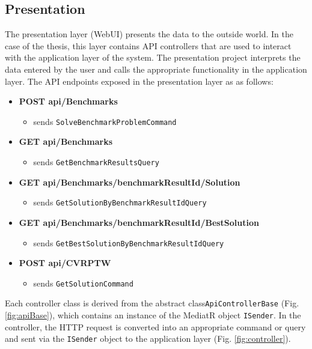 \documentclass[a4paper,twoside,12pt]{book}
\begin{document}
\subsection{Presentation}

The presentation layer (WebUI) presents the data to the outside world. In the case of the thesis, this layer contains API controllers that are used to interact with the application layer of the system. The presentation project interprets the data entered by the user and calls the appropriate functionality in the application layer. The API endpoints exposed in the presentation layer as as follows:
\begin{itemize}
    \item \textbf{POST api/Benchmarks}
     \begin{itemize}
     \item sends \lstinline{SolveBenchmarkProblemCommand}
     \end{itemize}
    \item \textbf{GET api/Benchmarks}
    \begin{itemize}
     \item sends \lstinline{GetBenchmarkResultsQuery}
     \end{itemize}
    \item \textbf{GET api/Benchmarks/{benchmarkResultId}/Solution}
      \begin{itemize}
     \item sends \lstinline{GetSolutionByBenchmarkResultIdQuery} 
     \end{itemize} 
    \item \textbf{GET api/Benchmarks/{benchmarkResultId}/BestSolution}
    \begin{itemize}
     \item sends \lstinline{GetBestSolutionByBenchmarkResultIdQuery} 
     \end{itemize}  
    \item \textbf{POST api/CVRPTW}
        \begin{itemize}
     \item sends \lstinline{GetSolutionCommand} 
     \end{itemize} 
\end{itemize}

Each controller class is derived from the abstract class\lstinline{ApiControllerBase} (Fig. \ref{fig:apiBase}), which contains an instance of the MediatR object \lstinline{ISender}. In the controller, the HTTP request is converted into an appropriate command or query and sent via the \lstinline{ISender} object to the application layer (Fig. \ref{fig:controller}).
\end{document}
